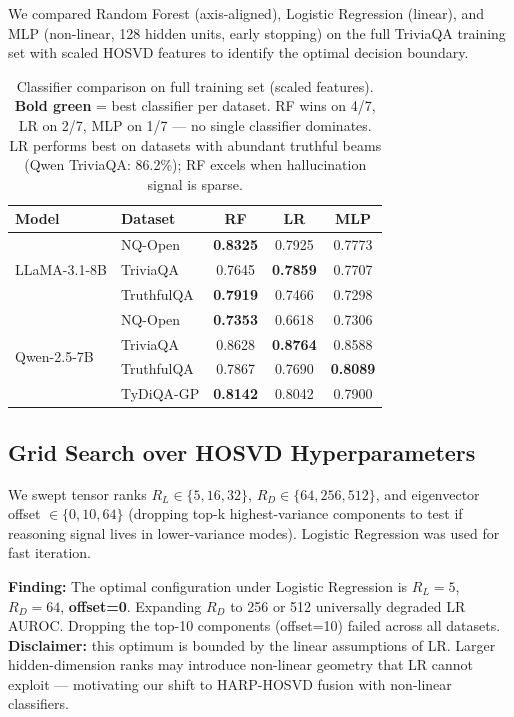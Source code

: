\documentclass[11pt,a4paper]{article}
\begin{document}
We compared Random Forest (axis-aligned), Logistic Regression (linear), and
MLP (non-linear, 128 hidden units, early stopping) on the full TriviaQA
training set with scaled HOSVD features to identify the optimal decision
boundary.

\begin{table}[h]
\centering
\small
\begin{tabular}{llccc}
\toprule
\textbf{Model} & \textbf{Dataset} & \textbf{RF} & \textbf{LR} & \textbf{MLP} \\
\midrule
\multirow{3}{*}{LLaMA-3.1-8B}
  & NQ-Open    & \textcolor{upgreen}{\textbf{0.8325}} & 0.7925 & 0.7773 \\
  & TriviaQA   & 0.7645 & \textcolor{upgreen}{\textbf{0.7859}} & 0.7707 \\
  & TruthfulQA & \textcolor{upgreen}{\textbf{0.7919}} & 0.7466 & 0.7298 \\
\midrule
\multirow{4}{*}{Qwen-2.5-7B}
  & NQ-Open    & \textcolor{upgreen}{\textbf{0.7353}} & 0.6618 & 0.7306 \\
  & TriviaQA   & 0.8628 & \textcolor{upgreen}{\textbf{0.8764}} & 0.8588 \\
  & TruthfulQA & 0.7867 & 0.7690 & \textcolor{upgreen}{\textbf{0.8089}} \\
  & TyDiQA-GP  & \textcolor{upgreen}{\textbf{0.8142}} & 0.8042 & 0.7900 \\
\bottomrule
\end{tabular}
\caption{Classifier comparison on full training set (scaled features).
         \textbf{Bold green} = best classifier per dataset.  RF wins on 4/7,
         LR on 2/7, MLP on 1/7 --- no single classifier dominates.  LR
         performs best on datasets with abundant truthful beams (Qwen
         TriviaQA: 86.2\%); RF excels when hallucination signal is sparse.}
\end{table}

\subsection{Grid Search over HOSVD Hyperparameters}

We swept tensor ranks $R_L \in \{5, 16, 32\}$, $R_D \in \{64, 256, 512\}$,
and eigenvector offset $\in \{0, 10, 64\}$ (dropping top-k highest-variance
components to test if reasoning signal lives in lower-variance modes).
Logistic Regression was used for fast iteration.

\noindent
\textbf{Finding:} The optimal configuration under Logistic Regression is
$R_L=5$, $R_D=64$, \textbf{offset=0}.  Expanding $R_D$ to 256 or 512
universally degraded LR AUROC.  Dropping the top-10 components (offset=10)
failed across all datasets.  \textbf{Disclaimer:} this optimum is bounded
by the linear assumptions of LR.  Larger hidden-dimension ranks may
introduce non-linear geometry that LR cannot exploit --- motivating our
shift to HARP-HOSVD fusion with non-linear classifiers.
\end{document}

